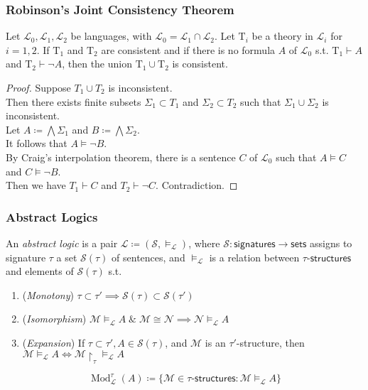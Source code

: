 \documentclass[UTF8,11pt,colorlinks,compress,openany]{beamer}%
\begin{document}
\begin{frame}\frametitle{Robinson's Joint Consistency Theorem}
\begin{theorem}
	Let $\mathscr{L}_0,\mathscr{L}_1,\mathscr{L}_2$ be languages, with $\mathscr{L}_0=\mathscr{L}_1\cap \mathscr{L}_2$. Let $\mathrm{T}_i$ be a theory in $\mathscr{L}_i$ for $i=1,2$. If $\mathrm{T}_1$ and $\mathrm{T}_2$ are consistent and if there is no formula $A$ of $\mathscr{L}_0$ s.t. $\mathrm{T}_1\vdash A$ and $\mathrm{T}_2\vdash\neg A$, then the union $\mathrm{T}_1\cup \mathrm{T}_2$ is consistent.
\end{theorem}
\begin{proof}
	Suppose $T_1\cup T_2$ is inconsistent.\\
	Then there exists finite subsets $\Sigma_1\subset T_1$ and $\Sigma_2\subset T_2$ such that $\Sigma_1\cup\Sigma_2$ is inconsistent.\\
	Let $A\coloneqq\bigwedge\Sigma_1$ and $B\coloneqq\bigwedge\Sigma_2$.\\
	It follows that $A\vDash\neg B$.\\
	By Craig's interpolation theorem, there is a sentence $C$ of $\mathscr{L}_0$ such that $A\vDash C$ and $C\vDash\neg B$.\\
	Then we have $T_1\vdash C$ and $T_2\vdash\neg C$. Contradiction.
\end{proof}
\end{frame}

\begin{frame}\frametitle{Abstract Logics}
	\begin{definition}
		An \emph{abstract logic} is a pair $\mathcal{L}\coloneqq (\mathcal{S},\vDash_{\mathcal{L}})$, where $\mathcal{S}:\mathsf{signatures}\to\mathsf{sets}$ assigns to signature $\tau$ a set $\mathcal{S}(\tau)$ of sentences, and $\vDash_{\mathcal{L}}$ is a relation between $\tau$-$\mathsf{structures}$ and elements of
		$\mathcal{S}(\tau)$ s.t.
		\begin{enumerate}
			\item (\emph{Monotony}) $\tau\subset\tau'\implies \mathcal{S}(\tau) \subset \mathcal{S}(\tau')$
			\item (\emph{Isomorphism}) $\mathcal{M}\vDash_{\mathcal{L}} A\;\&\;\mathcal{M} \cong \mathcal{N}\implies\mathcal{N}\vDash_{\mathcal{L}}	 A$
			\item (\emph{Expansion}) If $\tau\subset\tau', A\in \mathcal{S}(\tau)$, and $\mathcal{M}$ is an $\tau'$-structure, then $\mathcal{M}\vDash_{\mathcal{L}} A\iff\mathcal{M}{\restriction_\tau}\vDash_{\mathcal{L}} A$
		\end{enumerate}
	\end{definition}
	\[\operatorname{Mod}_{\mathcal{L}}^\tau(A)\coloneqq \big\{\mathcal{M}\in\tau\text{-}\mathsf{structures}:\mathcal{M}\vDash_{\mathcal{L}} A\big\}\]
\end{frame}
\end{document}

